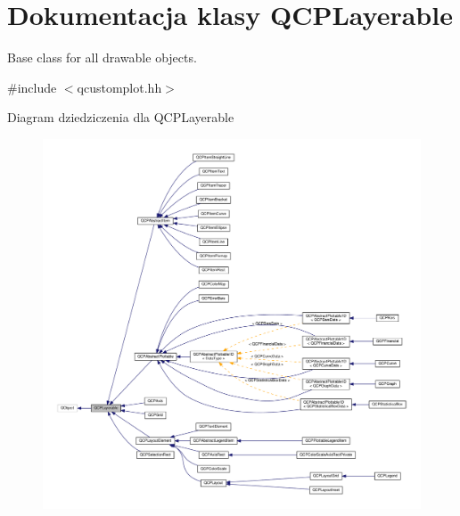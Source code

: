 \hypertarget{class_q_c_p_layerable}{}\section{Dokumentacja klasy Q\+C\+P\+Layerable}
\label{class_q_c_p_layerable}


Base class for all drawable objects.  




{\ttfamily \#include $<$qcustomplot.\+hh$>$}



Diagram dziedziczenia dla Q\+C\+P\+Layerable\nopagebreak
\begin{figure}[H]
\begin{center}
\leavevmode
\includegraphics[width=350pt]{class_q_c_p_layerable__inherit__graph}
\end{center}
\end{figure}


